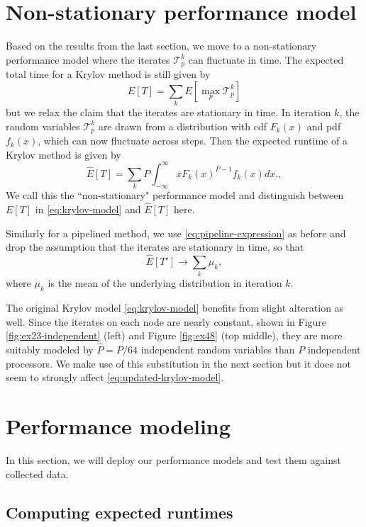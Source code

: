\documentclass[sigconf]{acmart}
\begin{document}
\section{Non-stationary performance model} \label{sec:updated-model}

Based on the results from the last section, we move to a non-stationary performance model where the iterates $\mathcal{T}^k_p$ can fluctuate in time.
The expected total time for a Krylov method is still given by 
$$E[T] = \sum_k E[ \max_p \mathcal{T}^k_p]$$
but we relax the claim that the iterates are stationary in time. In iteration $k$, the random variables $\mathcal{T}^k_p$ are drawn from a distribution with cdf $F_k(x)$ and pdf $f_k(x)$, which can now fluctuate across steps.
Then the expected runtime of a Krylov method is given by 
\begin{equation}
\widehat{E}[T] =  \sum_k P \int ^{\infty}_{-\infty} x F_k(x)^{P-1} f_k(x) dx. \label{eq:updated-krylov-model},
\end{equation}
We call this the ``non-stationary" performance model and distinguish between $E[T]$ in \eqref{eq:krylov-model} and $\widehat{E}[T]$ here.


Similarly for a pipelined method, we use \eqref{eq:pipeline-expression} as before and drop the assumption that the iterates are stationary in time, so that
\begin{equation}
\widehat{E}[T'] \rightarrow  \sum_k \mu_k \label{eq:updated-pipelined-model},
\end{equation}
where $\mu_k$ is the mean of the underlying distribution in iteration $k$. 

The original Krylov model \eqref{eq:krylov-model} benefits from slight alteration as well. 
Since the iterates on each node are nearly constant, shown in Figure \eqref{fig:ex23-independent} (left) and Figure \ref{fig:ex48} (top middle), they are more suitably modeled by $\widehat{P} = P/64$  independent random variables than $P$ independent processors. We make use of this substitution in the next section but it does not seem to strongly affect \eqref{eq:updated-krylov-model}.


\section{Performance modeling} \label{sec:performance-model}

In this section, we will deploy our performance models and test them against collected data.

\subsection{Computing expected runtimes} \label{sec:computing-runtimes}
\end{document}
